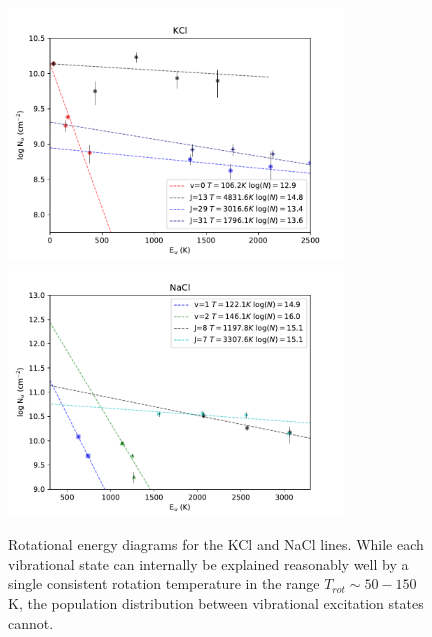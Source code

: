 \documentclass[12pt]{article}
\newcommand{\kms}{\textrm{km~s}\ensuremath{^{-1}}\xspace}	%
\begin{document}
\begin{figure}[!htp]
\includegraphics[scale=1,width=3.5in]{figures/KCl_rotational_diagrams.pdf}
\includegraphics[scale=1,width=3.5in]{figures/NaCl_rotational_diagrams.pdf}
\caption{Rotational energy diagrams for the KCl and NaCl lines.  While each
vibrational state can internally be explained reasonably well by a single
consistent rotation temperature in the range $T_{rot}\sim50-150$ K, the population
distribution between vibrational excitation states cannot.}
\label{fig:rotationdiagrams}
\end{figure}



\end{document}
